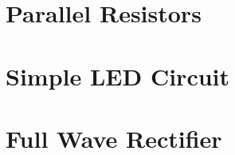 \documentclass{article}
\begin{document}
\section{Parallel Resistors}
\begin{figure}[H]
    \centering
    
\end{figure}

\section{Simple LED Circuit}
\begin{figure}[H]
    \centering
    
\end{figure}

\section{Full Wave Rectifier}
\begin{figure}[H]
    \centering
    
\end{figure}
\end{document}
